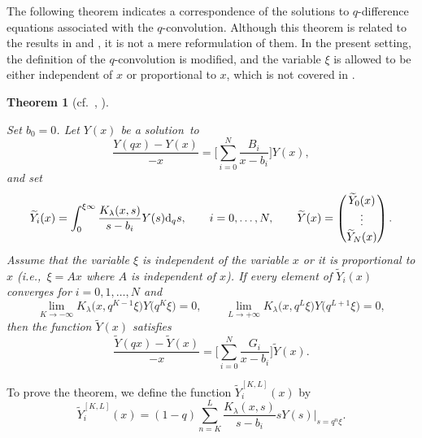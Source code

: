 \documentclass[pdftex]{sigma}
\numberwithin{equation}{section}
\newtheorem{Theorem}{Theorem}[section]
\theoremstyle{definition}
\begin{document}
The following theorem indicates a correspondence of the solutions to $q$-difference equations associated with the $q$-convolution.
Although this theorem is related to the results in \cite[Theorem~2.1]{SY} and \cite[Corollary 2.3]{AT}, it is not a mere reformulation of them.
In the present setting, the definition of the $q$-convolution is modified, and the variable $\xi$ is allowed to be either independent of $x$ or proportional to $x$, which is not covered in \cite{AT,SY}.
\begin{Theorem}[{cf.\ \cite[Theorem 2.1]{SY}, \cite[Corollary 2.3]{AT}}] \label{thm:qcint}

Set $b_0=0$.
Let $Y(x)$ be a solution~to
\begin{equation}
\frac{Y(q x) - Y(x )}{-x} = \Biggl[ \sum^{N}_{i = 0}\frac{B_{i}}{x -b_{i}} \Biggr] Y(x) ,
\label{eq:YqxBYx}
\end{equation}
and set
\begin{equation}
 \widetilde{Y}_{i}(x) = \int^{\xi \infty}_{0}\frac{K_{\lambda}(x, s)}{s-b_{i}}Y(s) {\rm d}_{q}s,\qquad i=0,\dots ,N, \qquad \widetilde{Y}(x) = \begin{pmatrix} \widetilde{Y}_{0}(x) \\ \vdots \\ \widetilde{Y}_{N}(x) \end{pmatrix}.  \label{eq:qcintadd}
\end{equation}
Assume that the variable $\xi $ is independent of the variable $x$ or it is proportional to $x$ {\rm(}i.e.,~$\xi =Ax$ where $A $ is independent of $x${\rm)}.
If every element of $\widetilde{Y}_{i} (x) $ converges for $i=0,1 , \dots ,N$ and
\begin{equation}
\lim _{K \to -\infty} K_{\lambda}\bigl(x, q^{K-1} \xi\bigr)Y\bigl(q^{K} \xi\bigr) =0,\qquad \lim _{L \to +\infty } K_{\lambda}\bigl(x, q^{L} \xi\bigr)Y\bigl(q^{L+1} \xi\bigr) =0,
\label{eq:tPKLlim0}
\end{equation}
then the function $\widetilde{Y}(x)$ satisfies
\begin{equation*}
\frac{\widetilde{Y}(q x) - \widetilde{Y}(x )}{-x} = \Biggl[ \sum^{N}_{i = 0}\frac{G_{i}}{x -b_{i}} \Biggr] \widetilde{Y}(x).
\end{equation*}
\end{Theorem}
To prove the theorem, we define the function $\widetilde{Y}_{i}^{[K,L]}(x)$ by
\begin{equation}
\widetilde{Y}_{i}^{[K,L]}(x) = (1-q) \sum _{n=K}^{L} \frac{K_{\lambda}(x, s)}{s-b_{i}} s Y(s) |_{s= q^n \xi }.
\label{eq:tYiKLdef}
\end{equation}
\end{document}
